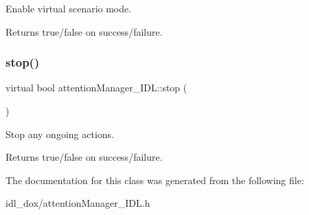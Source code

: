 Enable virtual scenario mode. 

\begin{DoxyReturn}{Returns}
true/false on success/failure. 
\end{DoxyReturn}
\mbox{\label{classattentionManager__IDL_aa5e3fb18a0336d8b65c316e7f6a675a8}} 
\subsubsection{\texorpdfstring{stop()}{stop()}}
{\footnotesize\ttfamily virtual bool attention\+Manager\+\_\+\+I\+D\+L\+::stop (\begin{DoxyParamCaption}{ }\end{DoxyParamCaption})\hspace{0.3cm}{\ttfamily [virtual]}}



Stop any ongoing actions. 

\begin{DoxyReturn}{Returns}
true/false on success/failure. 
\end{DoxyReturn}


The documentation for this class was generated from the following file\+:\begin{DoxyCompactItemize}
\item 
idl\+\_\+dox/attention\+Manager\+\_\+\+I\+D\+L.\+h\end{DoxyCompactItemize}
